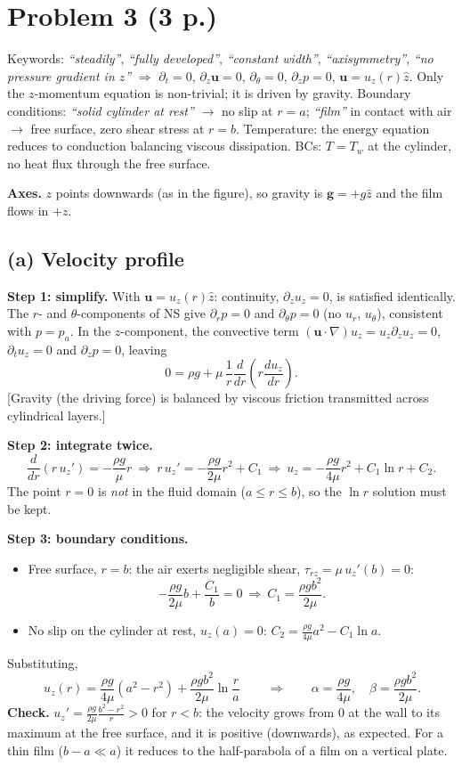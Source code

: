 \documentclass[11pt]{article}
\newcommand{\pd}{\partial}
\newcommand{\bu}{\mathbf u}
\newcommand{\kw}[1]{{\color{kw}\itshape ``#1''}}
\newcommand{\why}[1]{{\color{gray}\small[#1]}}
\begin{document}
\section*{Problem 3 \normalsize(3 p.)}

\begin{strategy}
Keywords: \kw{steadily}, \kw{fully developed}, \kw{constant width}, \kw{axisymmetry}, \kw{no pressure gradient in $z$} $\Rightarrow$ $\pd_t=0$, $\pd_z\bu=0$, $\pd_\theta=0$, $\pd_zp=0$, $\bu=u_z(r)\hat z$.
Only the $z$-momentum equation is non-trivial; it is driven by gravity. Boundary conditions: \kw{solid cylinder at rest} $\to$ no slip at $r=a$; \kw{film} in contact with air $\to$ free surface, zero shear stress at $r=b$.
Temperature: the energy equation reduces to conduction balancing viscous dissipation. BCs: $T=T_w$ at the cylinder, no heat flux through the free surface.
\end{strategy}

\textbf{Axes.} $z$ points downwards (as in the figure), so gravity is $\mathbf g=+g\hat z$ and the film flows in $+z$.

\subsection*{(a) Velocity profile}
\textbf{Step 1: simplify.} With $\bu=u_z(r)\hat z$: continuity, $\pd_zu_z=0$, is satisfied identically. The $r$- and $\theta$-components of NS give $\pd_rp=0$ and $\pd_\theta p=0$ (no $u_r$, $u_\theta$), consistent with $p=p_a$. In the $z$-component, the convective term $(\bu\cdot\nabla)u_z=u_z\pd_zu_z=0$, $\pd_tu_z=0$ and $\pd_zp=0$, leaving
\[
0=\rho g+\mu\,\frac1r\frac{d}{dr}\!\left(r\frac{du_z}{dr}\right).
\]
\why{Gravity (the driving force) is balanced by viscous friction transmitted across cylindrical layers.}

\textbf{Step 2: integrate twice.}
\[
\frac{d}{dr}\!\left(r\,u_z'\right)=-\frac{\rho g}{\mu}r
\ \Rightarrow\
r\,u_z'=-\frac{\rho g}{2\mu}r^2+C_1
\ \Rightarrow\
u_z=-\frac{\rho g}{4\mu}r^2+C_1\ln r+C_2 .
\]
The point $r=0$ is \emph{not} in the fluid domain ($a\le r\le b$), so the $\ln r$ solution must be kept.

\textbf{Step 3: boundary conditions.}
\begin{itemize}
\item Free surface, $r=b$: the air exerts negligible shear, $\tau_{rz}=\mu\,u_z'(b)=0$:
\[
-\frac{\rho g}{2\mu}b+\frac{C_1}{b}=0\ \Rightarrow\ C_1=\frac{\rho g b^2}{2\mu}.
\]
\item No slip on the cylinder at rest, $u_z(a)=0$: $C_2=\frac{\rho g}{4\mu}a^2-C_1\ln a$.
\end{itemize}
Substituting,
\[
\boxed{\,u_z(r)=\frac{\rho g}{4\mu}\left(a^2-r^2\right)+\frac{\rho g b^2}{2\mu}\ln\frac{r}{a}\,}
\qquad\Longrightarrow\qquad
\alpha=\frac{\rho g}{4\mu},\quad \beta=\frac{\rho g b^2}{2\mu}.
\]
\textbf{Check.} $u_z'=\frac{\rho g}{2\mu}\frac{b^2-r^2}{r}>0$ for $r<b$: the velocity grows from 0 at the wall to its maximum at the free surface, and it is positive (downwards), as expected. For a thin film ($b-a\ll a$) it reduces to the half-parabola of a film on a vertical plate.
\end{document}
